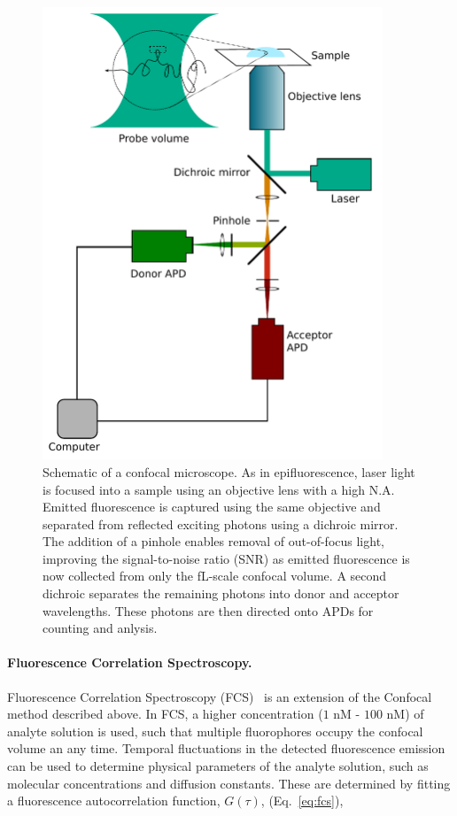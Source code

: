 \begin{figure}
	\begin{center}
	\includegraphics*[clip=true, width=4in]{introduction/confocal.pdf}
	\caption{Schematic of a confocal microscope. As in epifluorescence, laser light is focused into a sample using an objective lens with a high N.A. Emitted fluorescence is captured using the same objective and separated from reflected exciting photons using a dichroic mirror. The addition of a pinhole enables removal of out-of-focus light, improving the signal-to-noise ratio (SNR) as emitted fluorescence is now collected from only the fL-scale confocal volume. A second dichroic separates the remaining photons into donor and acceptor wavelengths. These photons are then directed onto APDs for counting and anlysis.}
	\label{fig:confocal}
	\end{center}
\end{figure}

\paragraph{Fluorescence Correlation Spectroscopy.}
Fluorescence Correlation Spectroscopy (FCS)~\cite{Magde1972} is an extension of the Confocal method described above. In FCS, a higher concentration ($1$ nM - $100$ nM) of analyte solution is used, such that multiple fluorophores occupy the confocal volume an any time. Temporal fluctuations in the detected fluorescence emission can be used to determine physical parameters of the analyte solution, such as molecular concentrations and diffusion constants. These are determined by fitting a fluorescence autocorrelation function, $G(\tau)$, (Eq.~\ref{eq:fcs}), 

